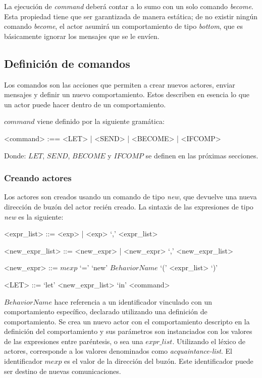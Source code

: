 La ejecución de \textit{command} deberá contar a lo sumo con un solo comando \textit{become}. Esta propiedad tiene que ser garantizada de manera estática; de no existir ningún comando \textit{become}, el actor asumirá un comportamiento de tipo \textit{bottom}, que es básicamente ignorar los mensajes que se le envíen.

\subsection{Definición de comandos}\label{actores:cmd}
Los comandos son las acciones que permiten a \SAL crear nuevos actores, enviar mensajes y definir un nuevo comportamiento. Estos describen en esencia lo que un actor puede hacer dentro de un comportamiento.

$command$ viene definido por la siguiente gramática:
\begin{grammar}
<command> :== <LET> | <SEND> | <BECOME> | <IFCOMP>
\end{grammar}

Donde: $LET$, $SEND$, $BECOME$ y $IFCOMP$ se definen en las próximas secciones.

\subsubsection*{Creando actores}
Los actores son creados usando un comando de tipo \textit{new}, que devuelve una nueva dirección de buzón del actor recién creado. La sintaxis de las expresiones de tipo \textit{new} es la siguiente:

\begin{grammar}
  <expr_list> ::= <exp> | <exp> `,' <expr_list>  

  <new_expr_list> ::= <new_expr> | <new_expr> `,' <new_expr_list>
  
  <new_expr> ::= $mexp$ `=' `new' $BehaviorName$ `(' <expr_list> `)'
  
  <LET> ::=  `let' <new_expr_list> `in' <command> 
\end{grammar}

$BehaviorName$ hace referencia a un identificador vinculado con un comportamiento específico, declarado utilizando una definición de comportamiento. Se crea un nuevo actor con el comportamiento descripto en la definición del comportamiento y sus parámetros son instanciados con los valores de las expresiones entre paréntesis, o sea una $expr\_list$. Utilizando el léxico de actores, corresponde a los valores denominados como \textit{acquaintance-list}. El identificador $mexp$ es el valor de la dirección del buzón. Este identificador puede ser destino de nuevas comunicaciones. 

